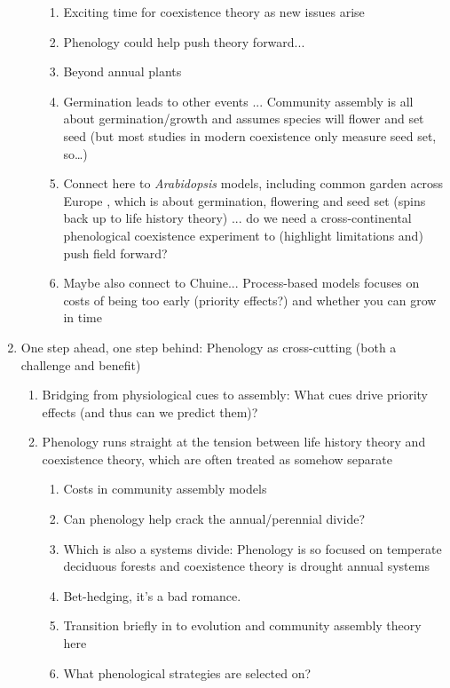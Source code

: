 \documentclass[11pt]{article}
\begin{document}
\begin{enumerate}
\begin{enumerate}
\begin{enumerate}
\item Exciting time for coexistence theory as new issues arise \citep{Barabas2018,song2019}
\item Phenology could help push theory forward...
\item Beyond annual plants 
\item Germination leads to other events ... Community assembly is all about germination/growth and assumes species will flower and set seed (but most studies in modern coexistence only measure seed set, so…)
\item Connect here to \emph{Arabidopsis} models, including common garden across Europe \citep{Stinchcombe:2004ec,arabid2011}, which is about germination, flowering and seed set (spins back up to life history theory) ... do we need a cross-continental phenological coexistence experiment to (highlight limitations and) push field forward? 
\item Maybe also connect to Chuine... Process-based models focuses on costs of being too early (priority effects?) and whether you can grow in time
\end{enumerate}
\end{enumerate}
\item One step ahead, one step behind: Phenology as cross-cutting (both a challenge and benefit) %
\begin{enumerate}
\item Bridging from physiological cues to assembly: What cues drive priority effects (and thus can we predict them)?
\item Phenology runs straight at the tension between life history theory and coexistence theory, which are often treated as somehow separate %
\begin{enumerate}
\item Costs in community assembly models %
\item Can phenology help crack the annual/perennial divide? 
\item Which is also a systems divide: Phenology is so focused on temperate deciduous forests and coexistence theory is drought annual systems 
\item Bet-hedging, it's a bad romance. 
\item Transition briefly in to evolution and community assembly theory here %
\item What phenological strategies are selected on?
\end{enumerate}
\end{enumerate}
\end{enumerate}
\end{document}
